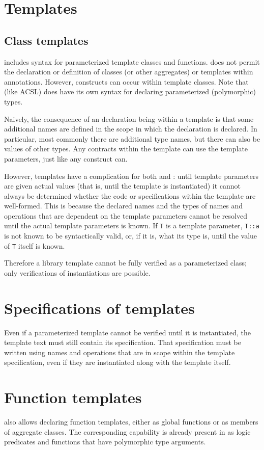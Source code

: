 \section{Templates}
\label{sec:tempaltes}
\subsection{Class templates}

\lang{} includes syntax for parameterized template classes and functions. \NAME{} does not permit the declaration or definition of classes (or other aggregates) or templates  within \NAME{} annotations. However, \NAME{} constructs can occur within template classes. Note that \NAME{} (like ACSL) does have its own syntax for declaring parameterized (polymorphic) types.

Naively, the consequence of an \NAME{} declaration being within a template is that some additional names are defined in the scope in which the \NAME{} declaration is declared. In particular, most commonly there are additional type names, but there can also be values of other types. Any \NAME{} contracts within the template can use the template parameters, just like any \lang{} construct can. 

However, templates have a complication for both \lang{} and \NAME{}: until template parameters are given actual values (that is, until the template is instantiated) it cannot always be determined whether the code or specifications within the template are well-formed. This is because the declared names and the types of names and operations that are dependent on the template parameters cannot be resolved until the actual template parameters is known.  If \lstinline|T| is a template parameter, \lstinline|T::a| is not known to be syntactically valid, or, if it is, what its type is, until the value of \lstinline|T| itself is known.

Therefore a library template cannot be fully verified as a parameterized class; only verifications of instantiations are possible.

\section{Specifications of templates}

Even if a parameterized template cannot be verified until it is instantiated, the template text must still contain its specification. That specification must be written using names and operations that are in scope within the template specification, even if they are instantiated along with the template itself.

\section{Function templates}

\lang{} also allows declaring function templates, either as global functions or as members of aggregate classes. The corresponding capability is already present in \NAME{} as logic predicates and functions that have polymorphic type arguments.